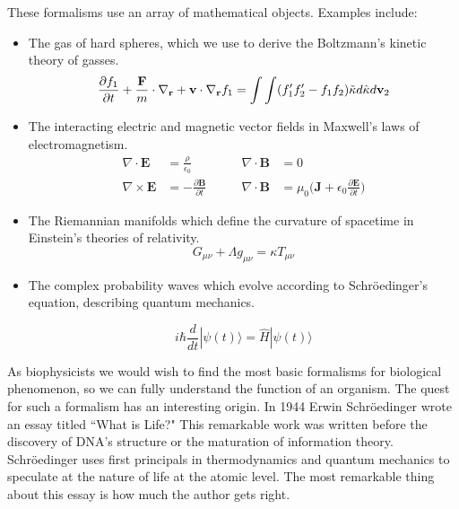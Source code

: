 
These formalisms use an array of mathematical objects. Examples include:
\begin{itemize}
\item The gas of hard spheres, which we use to derive the Boltzmann's kinetic theory of gasses.  
\begin{equation}
	\label{hard_spheres}
	\frac{\partial f_1}{\partial t} + \frac{\bold{F}}{m}\cdot\nabla_\bold{r} + \bold{v} \cdot \nabla_\bold{r} f_1 =  \int \int (f'_1f'_2 - f_1 f_2) \tilde \kappa d \hat \kappa d \bold{v}_2
\end{equation}

\item The interacting electric and magnetic vector fields in Maxwell's laws of electromagnetism.
\begin{equation}
	\begin{aligned}
		\nabla \cdot  \mathbf{E} &= \frac{\rho}{\epsilon_0} \qquad & \nabla \cdot  \mathbf{B} &= 0 \\
		\nabla \times  \mathbf{E} &= -\frac{\partial \mathbf{B}}{\partial t} \qquad &  \nabla \cdot  \mathbf{B} &= \mu_0 \big(\mathbf{J} + \epsilon_0 \frac{\partial \mathbf{E} } {\partial t }\big)
	\end{aligned}
\end{equation}

\item The Riemannian manifolds which define the curvature of spacetime in Einstein's theories of relativity.
\begin{equation}
	G_{\mu \nu} + \Lambda g_{\mu \nu} = \kappa T_{\mu \nu}
\end{equation}

\item The complex probability waves which evolve according to Schr\"oedinger's equation, describing quantum mechanics. 

\begin{equation}
	i \hbar \frac{d}{dt} | \psi (t) \rangle = \hat {H} | \psi (t) \rangle 
\end{equation}
\end{itemize}

As biophysicists we would wish to find the most basic formalisms for biological phenomenon, so we can fully understand the function of an organism. The quest for such a formalism has an interesting origin. In 1944 Erwin Schr\"oedinger wrote an essay titled ``What is Life?" This remarkable work was written before the discovery of DNA's structure or the maturation of information theory. Schr\"oedinger uses first principals in thermodynamics and quantum mechanics to speculate at the nature of life at the atomic level. The most remarkable thing about this essay is how much the author gets right. 

